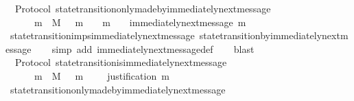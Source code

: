 \begin{isabellebody}
%
\endisatagproof
{\isafoldproof}%
%
\isadelimproof
\isanewline
%
\endisadelimproof
\isanewline
{}\isamarkupfalse%
\ {\isacharparenleft}\ Protocol{\isacharparenright}\ state{\isacharunderscore}transition{\isacharunderscore}only{\isacharunderscore}made{\isacharunderscore}by{\isacharunderscore}immediately{\isacharunderscore}next{\isacharunderscore}message{\isacharcolon}\ \isanewline
\ \ {\isachardoublequoteopen}{\isasymforall}\ {\isasymsigma}\ {\isasymin}{\isasymSigma}{\isachardot}\ {\isasymforall}\ m\ {\isasymin}\ M{\isachardot}\ {\isasymsigma}\ {\isasymunion}\ {\isacharbraceleft}m{\isacharbraceright}\ {\isasymin}\ {\isasymSigma}\ {\isasymand}\ m\ {\isasymnotin}\ {\isasymsigma}\ {\isasymlongleftrightarrow}\ immediately{\isacharunderscore}next{\isacharunderscore}message\ {\isacharparenleft}{\isasymsigma}{\isacharcomma}m{\isacharparenright}{\isachardoublequoteclose}\isanewline
%
\isadelimproof
\ \ %
\endisadelimproof
%
\isatagproof
{}\isamarkupfalse%
\ state{\isacharunderscore}transition{\isacharunderscore}imps{\isacharunderscore}immediately{\isacharunderscore}next{\isacharunderscore}message\ state{\isacharunderscore}transition{\isacharunderscore}by{\isacharunderscore}immediately{\isacharunderscore}next{\isacharunderscore}message\isanewline
\ \ \isamarkupfalse%
\ {\isacharparenleft}simp\ add{\isacharcolon}\ immediately{\isacharunderscore}next{\isacharunderscore}message{\isacharunderscore}def{\isacharparenright}\isanewline
\ \ \isamarkupfalse%
\ blast%
\endisatagproof
{\isafoldproof}%
%
\isadelimproof
\isanewline
%
\endisadelimproof
\isanewline
{}\isamarkupfalse%
\ {\isacharparenleft}\ Protocol{\isacharparenright}\ state{\isacharunderscore}transition{\isacharunderscore}is{\isacharunderscore}immediately{\isacharunderscore}next{\isacharunderscore}message{\isacharcolon}\ \isanewline
\ \ {\isachardoublequoteopen}{\isasymforall}\ {\isasymsigma}\ {\isasymin}{\isasymSigma}{\isachardot}\ {\isasymforall}\ m\ {\isasymin}\ M{\isachardot}\ {\isasymsigma}\ {\isasymunion}\ {\isacharbraceleft}m{\isacharbraceright}\ {\isasymin}\ {\isasymSigma}\ \ {\isasymlongleftrightarrow}\ justification\ m\ {\isasymsubseteq}\ {\isasymsigma}{\isachardoublequoteclose}\isanewline
%
\isadelimproof
\ \ %
\endisadelimproof
%
\isatagproof
{}\isamarkupfalse%
\ state{\isacharunderscore}transition{\isacharunderscore}only{\isacharunderscore}made{\isacharunderscore}by{\isacharunderscore}immediately{\isacharunderscore}next{\isacharunderscore}message\ \isanewline
\ \ \isamarkupfalse%

\end{isabellebody}

